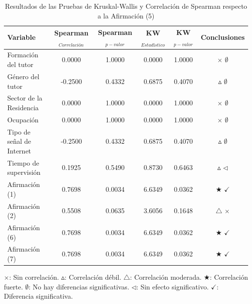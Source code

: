 				\begin{table}[h!]
					\centering
					\caption{Resultados de las Pruebas de Kruskal-Wallis y Correlación de Spearman respecto a la Afirmación (5)}
					\begin{tabularx}{\textwidth}{Xccccc}
						\toprule
						\textbf{Variable} & \textbf{Spearman$_{Correlación}$} & \textbf{Spearman$_{p-valor}$} & \textbf{KW$_{Estadístico}$} & \textbf{KW$_{p-valor}$} & \textbf{Conclusiones} \\
						\midrule
						Formación del tutor & 0.0000 & 1.0000 & 0.0000 & 1.0000 & \(\times\) \(\emptyset\) \\ %
						Género del tutor & -0.2500 & 0.4332 & 0.6875 & 0.4070 & \(\vartriangle\) \(\emptyset\) \\ %
						Sector de la Residencia & 0.0000 & 1.0000 & 0.0000 & 1.0000 & \(\times\) \(\emptyset\) \\ %
						Ocupación & 0.0000 & 1.0000 & 0.0000 & 1.0000 & \(\times\) \(\emptyset\) \\ %
						Tipo de señal de Internet & -0.2500 & 0.4332 & 0.6875 & 0.4070 & \(\vartriangle\) \(\emptyset\) \\ %
						Tiempo de supervisión & 0.1925 & 0.5490 & 0.8730 & 0.6463 & \(\vartriangle\) \(\triangleleft\) \\ %
						Afirmación (1) & 0.7698 & 0.0034 & 6.6349 & 0.0362 & \(\bigstar\) \(\checkmark\) \\ %
						Afirmación (2) & 0.5508 & 0.0635 & 3.6056 & 0.1648 & \(\triangle\) \(\times\) \\ %
						Afirmación (6) & 0.7698 & 0.0034 & 6.6349 & 0.0362 & \(\bigstar\) \(\checkmark\) \\ %
						Afirmación (7) & 0.7698 & 0.0034 & 6.6349 & 0.0362 & \(\bigstar\) \(\checkmark\) \\ %
						\bottomrule
					\end{tabularx}
					\label{table:kruskal-spearman-results}
					\parbox{\textwidth}{\footnotesize 
						\(\times\): Sin correlación. \(\vartriangle\): Correlación débil. \(\triangle\): Correlación moderada. \(\bigstar\): Correlación fuerte. \(\emptyset\): No hay diferencias significativas.  \(\triangleleft\): Sin efecto significativo. \(\checkmark\): Diferencia significativa.
					}
				\end{table}
				
